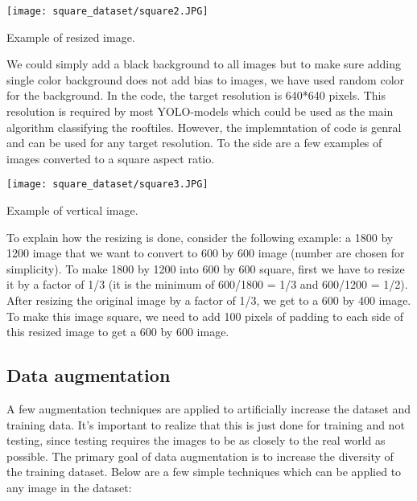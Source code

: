 \begin{marginfigure} %
	\texttt{[image: square\_dataset/square2.JPG]}
	\caption{Example of resized image.}
\end{marginfigure}

We could simply add a black background to all images but to make sure adding single color background does not add bias to images, we have used random color for the background. 
In the code, the target resolution is 640*640 pixels. This resolution is required by most YOLO-models which could be used as the main algorithm classifying the rooftiles. However, the implemntation of code is genral and can be used for any target resolution. 
To the side are a few examples of images converted to a square aspect ratio.


\begin{marginfigure} %
	\texttt{[image: square\_dataset/square3.JPG]}
	\caption{Example of vertical image.}
\end{marginfigure}

To explain how the resizing is done, consider the following example: a 1800 by 1200 image that we want to convert to 600 by 600 image (number are chosen for simplicity). To make 1800 by 1200 into 600 by 600 square, first we have to resize it by a factor of 1/3 (it is the minimum of 600/1800 = 1/3 and 600/1200 = 1/2). After resizing the original image by a factor of 1/3, we get to a 600 by 400 image. To make this image square, we need to add 100 pixels of padding to each side of this resized image to get a 600 by 600 image.



\newpage

\subsection{Data augmentation}
A few augmentation techniques are applied to artificially increase the dataset and training data. 
It's important to realize that this is just done for training and not testing, 
since testing requires the images to be as closely to the real world as possible. 
The primary goal of data augmentation is to increase the diversity of the training dataset. 
Below are a few simple techniques which can be applied to any image in the dataset:

